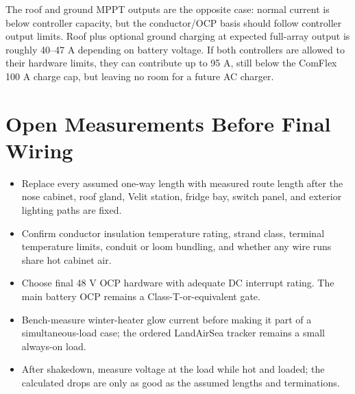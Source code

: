 \documentclass[10pt]{article}
\begin{document}
The roof and ground MPPT outputs are the opposite case: normal current is below controller capacity, but the conductor/OCP basis should follow controller output limits. Roof plus optional ground charging at expected full-array output is roughly 40--47 A depending on battery voltage. If both controllers are allowed to their hardware limits, they can contribute up to 95 A, still below the ComFlex 100 A charge cap, but leaving no room for a future AC charger.

\section*{Open Measurements Before Final Wiring}

\begin{itemize}
\item Replace every assumed one-way length with measured route length after the nose cabinet, roof gland, Velit station, fridge bay, switch panel, and exterior lighting paths are fixed.
\item Confirm conductor insulation temperature rating, strand class, terminal temperature limits, conduit or loom bundling, and whether any wire runs share hot cabinet air.
\item Choose final 48 V OCP hardware with adequate DC interrupt rating. The main battery OCP remains a Class-T-or-equivalent gate.
\item Bench-measure winter-heater glow current before making it part of a simultaneous-load case; the ordered LandAirSea tracker remains a small always-on load.
\item After shakedown, measure voltage at the load while hot and loaded; the calculated drops are only as good as the assumed lengths and terminations.
\end{itemize}
\end{document}
